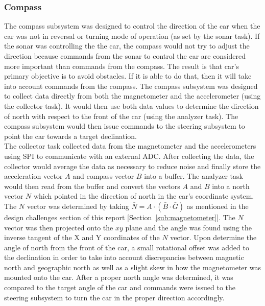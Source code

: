 \documentclass[final,letterpaper,singleside,12pt]{article}
\begin{document}
\pagebreak

\subsubsection{Compass} %
\label{ssub:compass}
The compass subsystem was designed to control the direction of the car when the car was not in reversal or turning mode of operation (as set by the sonar task). If the sonar was controlling the the car, the compass would not try to adjust the direction because commands from the sonar to control the car are considered more important than commands from the compass. The result is that car's primary objective is to avoid obstacles. If it is able to do that, then it will take into account commands from the compass. The compass subsystem was designed to collect data directly from both the magnetometer and the accelerometer (using the collector task). It would then use both data values to determine the direction of north with respect to the front of the car (using the analyzer task). The compass subsystem would then issue commands to the steering subsystem to point the car towards a target declination. \\
The collector task collected data from the magnetometer and the accelerometers using SPI to communicate with an external ADC. After collecting the data, the collector would average the data as necessary to reduce noise and finally store the acceleration vector $A$ and compass vector $B$ into a buffer. The analyzer task would then read from the buffer and convert the vectors $A$ and $B$ into a north vector $N$ which pointed in the direction of north in the car's coordinate system. The $N$ vector was determined by taking $\bar N=A \cdot \left(\bar B \cdot \bar G\right)$ as mentioned in the design challenges section of this report [Section~\ref{sub:magnetometer}]. The $N$ vector was then projected onto the $xy$ plane and the angle was found using the inverse tangent of the X and Y coordinates of the $N$ vector. Upon determine the angle of north from the front of the car, a small rotational offset was added to the declination in order to take into account discrepancies between magnetic north and geographic north as well as a slight skew in how the magnetometer was mounted onto the car. After a proper north angle was determined, it was compared to the target angle of the car and commands were issued to the steering subsystem to turn the car in the proper direction accordingly.

\pagebreak
\end{document}
